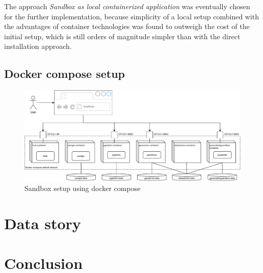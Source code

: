 \documentclass[11pt, a4paper, oneside, parskip=full-]{scrartcl}
\begin{document}
The approach \emph{Sandbox as local containerized application} was eventually
chosen for the further implementation, because simplicity of a local setup
combined with the advantages of container technologies was found to outweigh
the cost of the initial setup, which is still orders of magnitude simpler than
with the direct installation approach.


\subsection{Docker compose setup}
\begin{figure}[H]
  \centering
  \includegraphics[width=1\textwidth]{composeSetup}
  \caption{Sandbox setup using docker compose}
  \label{fig:sandboxsetup}
\end{figure}

\section{Data story}

\section{Conclusion}
\end{document}
